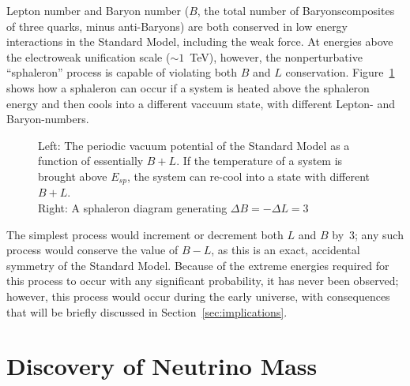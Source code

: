 \documentclass[/main.tex]{subfiles}
\begin{document}
Lepton number and Baryon number ($B$, the total number of Baryons\textemdash composites of three quarks, minus anti-Baryons) are both conserved in low energy interactions in the Standard Model, including the weak force.
At energies above the electroweak unification scale (${\sim}1$~TeV), however, the nonperturbative ``sphaleron'' process is capable of violating both $B$ and $L$ conservation.
Figure~\ref{fig:sphaleron} shows how a sphaleron can occur if a system is heated above the sphaleron energy and then cools into a different vaccuum state, with different Lepton- and Baryon-numbers.
\begin{figure}[t]
  \centering
  \caption[Standard Model Sphaleron]{\label{fig:sphaleron}
    Left: The periodic vacuum potential of the Standard Model as a function of essentially $B+L$. If the temperature of a system is brought above $E_{sp}$, the system can re-cool into a state with different $B+L$.\\
    Right: A sphaleron diagram generating $\Delta B = -\Delta L = 3$
  }
\end{figure}
The simplest process would increment or decrement both $L$ and $B$ by~3; any such process would conserve the value of $B-L$, as this is an exact, accidental symmetry of the Standard Model.
Because of the extreme energies required for this process to occur with any significant probability, it has never been observed; however, this process would occur during the early universe, with consequences that will be briefly discussed in Section~\ref{sec:implications}.

\section{Discovery of Neutrino Mass}
\end{document}
